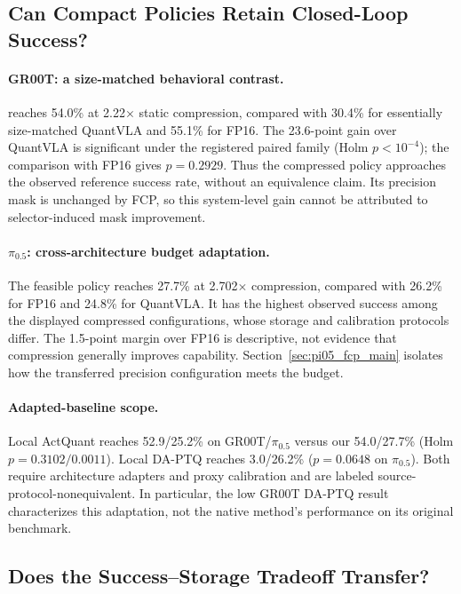 \subsection{Can Compact Policies Retain Closed-Loop Success?}
\label{sec:main_results}



\paragraph{GR00T: a size-matched behavioral contrast.}
\method reaches 54.0\% at 2.22$\times$ static compression, compared with 30.4\% for essentially size-matched QuantVLA and 55.1\% for FP16. The 23.6-point gain over QuantVLA is significant under the registered paired family (Holm $p<10^{-4}$); the comparison with FP16 gives $p=0.2929$. Thus the compressed policy approaches the observed reference success rate, without an equivalence claim. Its precision mask is unchanged by FCP, so this system-level gain cannot be attributed to selector-induced mask improvement.

\paragraph{$\pi_{0.5}$: cross-architecture budget adaptation.}
The feasible policy reaches 27.7\% at 2.702$\times$ compression, compared with 26.2\% for FP16 and 24.8\% for QuantVLA. It has the highest observed success among the displayed compressed configurations, whose storage and calibration protocols differ. The 1.5-point margin over FP16 is descriptive, not evidence that compression generally improves capability. Section~\ref{sec:pi05_fcp_main} isolates how the transferred precision configuration meets the budget.

\paragraph{Adapted-baseline scope.}
Local ActQuant reaches 52.9/25.2\% on GR00T/$\pi_{0.5}$ versus our 54.0/27.7\% (Holm $p=0.3102/0.0011$). Local DA-PTQ reaches 3.0/26.2\% ($p=0.0648$ on $\pi_{0.5}$). Both require architecture adapters and proxy calibration and are labeled source-protocol-nonequivalent. In particular, the low GR00T DA-PTQ result characterizes this adaptation, not the native method's performance on its original benchmark.

\subsection{Does the Success--Storage Tradeoff Transfer?}
\label{sec:libero_main}

